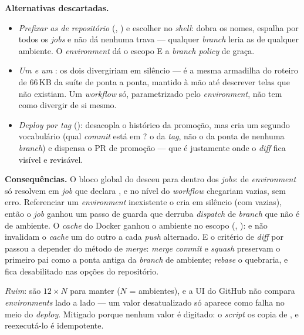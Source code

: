 \textbf{Alternativas descartadas.}
\begin{itemize}
  \item \emph{Prefixar as  de repositório} (,
    ) e escolher no \emph{shell}: dobra os nomes, espalha
     por todos os \emph{jobs} e não dá nenhuma trava --- qualquer
    \emph{branch} leria as  de qualquer ambiente. O \emph{environment}
    dá o escopo E a \emph{branch policy} de graça.
  \item \emph{Um  e um }: os dois
    divergiriam em silêncio --- é a mesma armadilha do roteiro de 66\,KB da
    suíte de ponta a ponta, mantido à mão até descrever telas que não existiam.
    Um \emph{workflow} só, parametrizado pelo \emph{environment}, não tem como
    divergir de si mesmo.
  \item \emph{Deploy por \emph{tag}} (): desacopla o histórico
    da promoção, mas cria um segundo vocabulário (qual \emph{commit} está em
    ? o da \emph{tag}, não o da ponta de nenhuma \emph{branch}) e
    dispensa o PR de promoção --- que é justamente onde o \emph{diff}
     fica visível e revisável.
\end{itemize}

\textbf{Consequências.} O bloco  global do  desceu
para dentro dos \emph{jobs}:  de \emph{environment} só resolvem em
\emph{job} que declara , e no nível do \emph{workflow}
chegariam vazias, sem erro. Referenciar um \emph{environment} inexistente o
cria em silêncio (com  vazias), então o \emph{job} 
ganhou um passo de guarda que derruba \emph{dispatch} de \emph{branch} que não
é de ambiente. O \emph{cache} do Docker ganhou o ambiente no escopo
(, ):  e  não invalidam o
\emph{cache} um do outro a cada \emph{push} alternado. E o critério de
\emph{diff} por  passou a depender do método de \emph{merge}:
\emph{merge commit} e \emph{squash} preservam o primeiro pai como a ponta
antiga da \emph{branch} de ambiente; \emph{rebase} o quebraria, e fica
desabilitado nas opções do repositório.

\emph{Ruim}: são $12 \times N$  para manter ($N$ = ambientes), e a UI
do GitHub não compara \emph{environments} lado a lado --- um valor desatualizado
só aparece como falha no meio do \emph{deploy}. Mitigado porque nenhum valor é
digitado: o \emph{script} os copia de , e reexecutá-lo é
idempotente.

